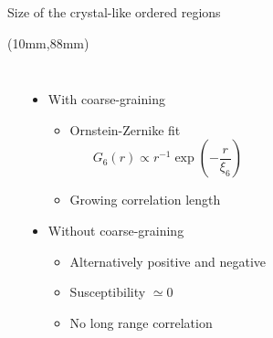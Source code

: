 \begin{frame}{Size of the crystal-like ordered regions}
	\begin{textblock*}{0.6\textwidth}(10mm,88mm)
		\simplephasediagram{}
	\end{textblock*}
	\begin{columns}
	\resizebox{\columnwidth}{!}{\begin{LARGE}\end{LARGE}}\\
	\resizebox{\columnwidth}{!}{\begin{LARGE}\end{LARGE}}
	\begin{itemize}
		\item With coarse-graining
		\begin{itemize}
			\item Ornstein-Zernike fit
			\[ G_6(r) \propto r^{-1}\exp( -\frac{r}{\xi_6} )\]
			\item Growing correlation length
		\end{itemize}
		
		\bigskip
		\item Without coarse-graining
		\begin{itemize}
			\item Alternatively positive and negative
			\item Susceptibility $\simeq 0$
			\item No long range correlation
		\end{itemize}
	\end{itemize}
	\end{columns}
\end{frame}

